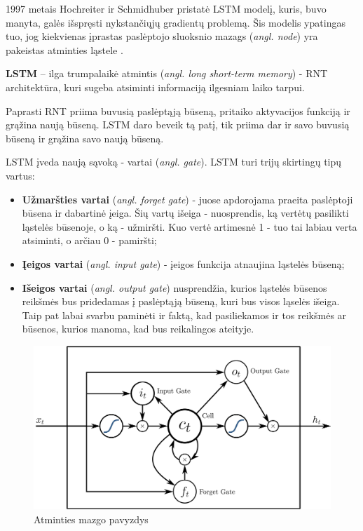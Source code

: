 \documentclass{VUMIFPSbakalaurinis}
\begin{document}
1997 metais Hochreiter ir Schmidhuber pristatė LSTM modelį, kuris, buvo manyta, galės išspręsti nykstančiųjų gradientų problemą. Šis modelis ypatingas tuo, jog kiekvienas įprastas paslėptojo sluoksnio mazags (\textit{angl. node}) yra pakeistas atminties ląstele \cite{DBLP:journals/corr/Lipton15}.

\textbf{LSTM} – ilga trumpalaikė atmintis (\textit{angl. long short-term memory}) - RNT architektūra, kuri sugeba atsiminti informaciją ilgesniam laiko tarpui. 

Paprasti RNT priima buvusią paslėptąją būseną, pritaiko aktyvacijos funkciją ir grąžina naują būseną. LSTM daro beveik tą patį, tik priima dar ir savo buvusią būseną ir grąžina savo naują būseną. 

LSTM įveda naują sąvoką - vartai (\textit{angl. gate}). LSTM turi trijų skirtingų tipų vartus:

\begin{itemize}
	\item \textbf{Užmaršties vartai} (\textit{angl. forget gate}) - juose apdorojama praeita paslėptoji būsena ir dabartinė įeiga. Šių vartų išeiga - nuosprendis, ką vertėtų pasilikti ląstelės būsenoje, o ką - užmiršti. Kuo vertė artimesnė 1 - tuo tai labiau verta atsiminti, o arčiau 0 - pamiršti;
	\item \textbf{Įeigos vartai} (\textit{angl. input gate}) - įeigos funkcija atnaujina ląstelės būseną;
	\item \textbf{Išeigos vartai} (\textit{angl. output gate}) nusprendžia, kurios ląstelės būsenos reikšmės bus pridedamas į paslėptąją būseną, kuri bus visos ląselės išeiga. Taip pat labai svarbu paminėti ir faktą, kad pasiliekamos ir tos reikšmės ar būsenos, kurios manoma, kad bus reikalingos ateityje.
\end{itemize}

\begin{figure}[H]
	\centering
	\includegraphics[scale=0.12]{img/lstm}
	\caption[]{Atminties mazgo pavyzdys\footnotemark}
	\label{img:lstm}
\end{figure}
\end{document}

